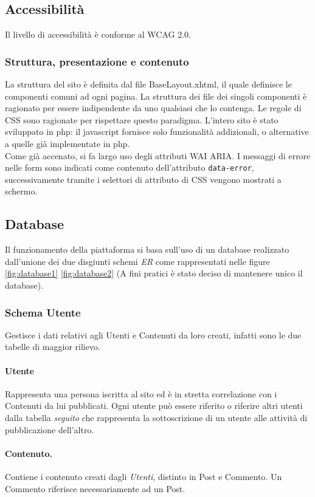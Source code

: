 \documentclass[12pt, a4paper]{article}
\begin{document}
    \subsection{Accessibilità}
    Il livello di accessibilità è conforme al WCAG 2.0.
    \subsubsection*{Struttura, presentazione e contenuto}
    La struttura del sito è definita dal file BaseLayout.xhtml, il quale definisce le componenti comuni ad ogni pagina. La struttura dei file dei singoli componenti è ragionato per essere indipendente da uno qualsiasi che lo contenga. Le regole di CSS sono ragionate per rispettare questo paradigma. L'intero sito è stato sviluppato in php: il javascript fornisce solo funzionalità addizionali, o alternative a quelle già implementate in php. \\
    Come già accenato, si fa largo uso degli attributi WAI ARIA. 
    I messaggi di errore nelle form sono indicati come contenuto dell'attributo \texttt{data-error}, successivamente tramite i selettori di attributo di CSS vengono mostrati a schermo.
    \newpage
    \subsection{Database}
    Il funzionamento della piattaforma si basa sull'uso di un database realizzato dall'unione dei due disgiunti schemi \emph{ER}
    come rappresentati nelle figure \ref{fig:database1} \ref{fig:database2} (A fini pratici è stato deciso di mantenere unico il database).
    \subsubsection{Schema Utente}
    Gestisce i dati relativi agli Utenti e Contenuti da loro creati, infatti sono le due tabelle di maggior rilievo.
    \paragraph{Utente}Rappresenta una persona iscritta al sito ed è in stretta correlazione con i Contenuti da lui pubblicati.
    Ogni utente può essere riferito o riferire altri utenti dalla tabella \emph{seguito}
    che rappresenta la sottoscrizione di un utente alle attività di pubblicazione dell'altro.
    \paragraph{Contenuto.} Contiene i contenuto creati dagli \emph{Utenti}, distinto in
    Post e Commento. Un Commento riferisce necessariamente ad un Post.
\end{document}

